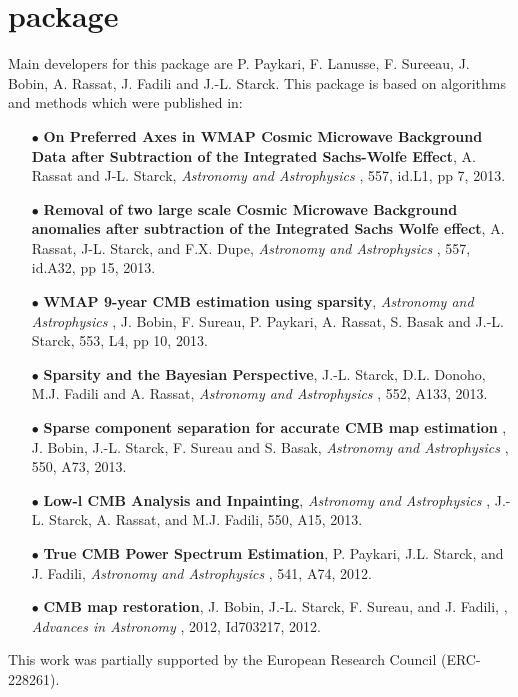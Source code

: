 \section*{\projscmb package}
Main developers for this package are  P. Paykari, F. Lanusse, F. Sureeau, J. Bobin,  A. Rassat, J. Fadili and  J.-L. Starck.
This package is based on algorithms and methods which were published in: \\
\begin{itemize}
\item[$\bullet$] \textbf{On Preferred Axes in WMAP Cosmic Microwave Background Data after Subtraction of the Integrated Sachs-Wolfe Effect}, A. Rassat and J-L. Starck,  \textit{Astronomy and Astrophysics} , 557, id.L1, pp 7, 2013.
\item[$\bullet$] \textbf{Removal of two large scale Cosmic Microwave Background anomalies after subtraction of the Integrated Sachs Wolfe effect}, A. Rassat, J-L. Starck, and F.X. Dupe,  \textit{Astronomy and Astrophysics} , 557, id.A32, pp 15, 2013.
\item[$\bullet$] \textbf{WMAP 9-year CMB estimation using sparsity}, \textit{Astronomy and Astrophysics} , J. Bobin, F. Sureau, P. Paykari, A. Rassat, S. Basak and J.-L. Starck, 553, L4, pp 10, 2013.
\item[$\bullet$] \textbf{Sparsity and the Bayesian Perspective}, J.-L. Starck, D.L. Donoho, M.J. Fadili and A. Rassat,  \textit{Astronomy and Astrophysics} , 552, A133, 2013.
\item[$\bullet$]\textbf{Sparse component separation for accurate CMB map estimation} ,  J. Bobin, J.-L. Starck, F. Sureau and S. Basak,  \textit{Astronomy and Astrophysics} , 550, A73, 2013.
\item[$\bullet$]  \textbf{Low-l CMB Analysis and Inpainting}, \textit{Astronomy and Astrophysics} , J.-L. Starck, A. Rassat, and M.J. Fadili, 550, A15, 2013.
\item[$\bullet$]  \textbf{True CMB Power Spectrum Estimation}, P. Paykari, J.L. Starck, and J. Fadili,  \textit{Astronomy and Astrophysics} , 541, A74, 2012.
\item[$\bullet$] \textbf{CMB map restoration}, J. Bobin, J.-L. Starck, F. Sureau, and J. Fadili, , \textit{Advances in Astronomy} , 2012, Id703217, 2012.
\end{itemize}
This work was partially supported by the European Research Council  (ERC-228261).


\newpage
\thispagestyle{empty}
$ $
\newpage


